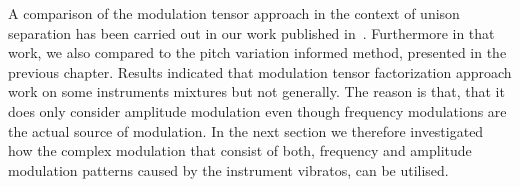 
%

A comparison of the modulation tensor approach in the context of unison separation has been carried out in our work published in~\cite{stoeter14}.
Furthermore in that work, we also compared to the pitch variation informed method, presented in the previous chapter.
Results indicated that modulation tensor factorization approach work on some instruments mixtures but not generally.
The reason is that, that it does only consider amplitude modulation even though frequency modulations are the actual source of modulation.
In the next section we therefore investigated how the complex modulation that consist of both, frequency and amplitude modulation patterns caused by the instrument vibratos, can be utilised.

